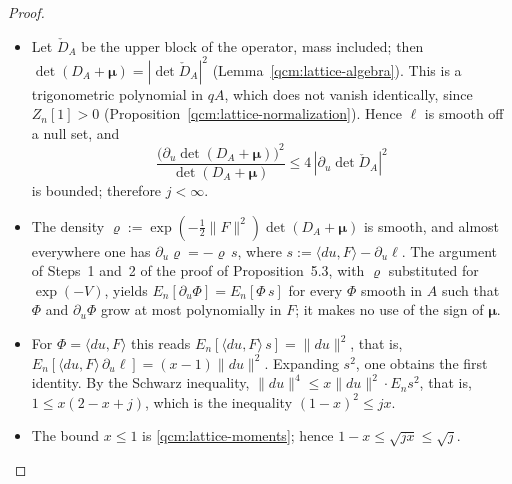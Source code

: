 \documentclass[11pt,letterpaper,reqno]{amsart}
\theoremstyle{definition}
\begin{document}
\begin{proof}
\begin{itemize}
\item[1.] Let $\check D_A$ be the upper block of the operator, mass included; then $\det(D_A+\boldsymbol\mu)=|\det\check D_A|^2$ (Lemma~\ref{qcm:lattice-algebra}).
This is a trigonometric polynomial in $qA$, which does not vanish identically, since $Z_n[1]>0$ (Proposition~\ref{qcm:lattice-normalization}).
Hence $\ell$ is smooth off a null set, and
\begin{equation*}
\frac{\bigl(\partial_u\det(D_A+\boldsymbol\mu)\bigr)^2}{\det(D_A+\boldsymbol\mu)}\le4\,|\partial_u\det\check D_A|^2
\end{equation*}
is bounded; therefore $j<\infty$.
\item[2.] The density $\varrho:=\exp(-\frac12\|F\|^2)\det(D_A+\boldsymbol\mu)$ is smooth, and almost everywhere one has $\partial_u\varrho=-\varrho\,s$, where $s:=\langle du,F\rangle-\partial_u\ell$.
The argument of Steps~1 and~2 of the proof of Proposition~5.3, with $\varrho$ substituted for $\exp(-V)$, yields $E_n[\partial_u\Phi]=E_n[\Phi\,s]$ for every $\Phi$ smooth in $A$ such that $\Phi$ and $\partial_u\Phi$ grow at most polynomially in $F$; it makes no use of the sign of $\boldsymbol\mu$.
\item[3.] For $\Phi=\langle du,F\rangle$ this reads $E_n[\langle du,F\rangle\,s]=\|du\|^2$, that is, $E_n[\langle du,F\rangle\,\partial_u\ell]=(x-1)\|du\|^2$.
Expanding $s^2$, one obtains the first identity.
By the Schwarz inequality, $\|du\|^4\le x\|du\|^2\cdot E_ns^2$, that is, $1\le x(2-x+j)$, which is the inequality $(1-x)^2\le jx$.
\item[4.] The bound $x\le1$ is \eqref{qcm:lattice-moments}; hence $1-x\le\sqrt{jx}\le\sqrt j$.
\qedhere
\end{itemize}
\end{proof}
\end{document}
